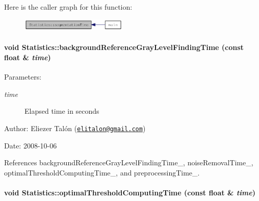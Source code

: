 Here is the caller graph for this function:\nopagebreak
\begin{figure}[H]
\begin{center}
\leavevmode
\includegraphics[width=144pt]{class_statistics_4cea19c3705fc315ce2b4300b3725ab8_icgraph}
\end{center}
\end{figure}
\hypertarget{class_statistics_5c9fede192f06bc757d18336dfcf84cf}{
\paragraph[backgroundReferenceGrayLevelFindingTime]{\setlength{\rightskip}{0pt plus 5cm}void Statistics::backgroundReferenceGrayLevelFindingTime (const float \& {\em time})}\hfill}
\label{class_statistics_5c9fede192f06bc757d18336dfcf84cf}


\begin{Desc}
\item[Parameters:]
\begin{description}
\item[{\em time}]Elapsed time in seconds\end{description}
\end{Desc}
\begin{Desc}
\item[Author:]Eliezer Talón (\href{mailto:elitalon@gmail.com}{\tt elitalon@gmail.com}) \end{Desc}
\begin{Desc}
\item[Date:]2008-10-06 \end{Desc}


References backgroundReferenceGrayLevelFindingTime\_\-, noiseRemovalTime\_\-, optimalThresholdComputingTime\_\-, and preprocessingTime\_\-.\hypertarget{class_statistics_90380f820c043813aafb85c1dc9a6393}{
\paragraph[optimalThresholdComputingTime]{\setlength{\rightskip}{0pt plus 5cm}void Statistics::optimalThresholdComputingTime (const float \& {\em time})}\hfill}
\label{class_statistics_90380f820c043813aafb85c1dc9a6393}


